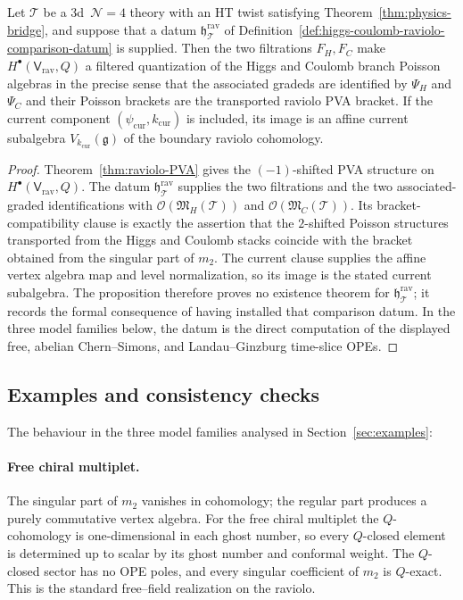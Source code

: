 \begin{proposition}
\label{prop:Higgs-Coulomb-compat}
Let $\mathcal T$ be a $3$d~$\mathcal N=4$ theory with an HT twist
satisfying Theorem~\ref{thm:physics-bridge}, and suppose that a datum
\(\mathfrak h_{\mathcal T}^{\mathrm{rav}}\) of
Definition~\ref{def:higgs-coulomb-raviolo-comparison-datum} is
supplied.  Then the two filtrations \(F_H,F_C\) make
\(H^\bullet(\mathsf V_{\mathrm{rav}},Q)\) a filtered quantization of
the Higgs and Coulomb branch Poisson algebras in the precise sense that
the associated gradeds are identified by \(\Psi_H\) and \(\Psi_C\) and
their Poisson brackets are the transported raviolo PVA bracket.  If
the current component \((\psi_{\mathrm{cur}},k_{\mathrm{cur}})\) is
included, its image is an affine current subalgebra
\(V_{k_{\mathrm{cur}}}(\mathfrak g)\) of the boundary raviolo
cohomology.
\end{proposition}
\begin{proof}
Theorem~\ref{thm:raviolo-PVA} gives the
\((-1)\)-shifted PVA structure on
\(H^\bullet(\mathsf V_{\mathrm{rav}},Q)\).  The datum
\(\mathfrak h_{\mathcal T}^{\mathrm{rav}}\) supplies the two filtrations
and the two associated-graded identifications with
\(\mathcal O(\mathfrak M_H(\mathcal T))\) and
\(\mathcal O(\mathfrak M_C(\mathcal T))\).  Its bracket-compatibility
clause is exactly the assertion that the \(2\)-shifted Poisson
structures transported from the Higgs and Coulomb stacks coincide with
the bracket obtained from the singular part of \(m_2\).  The current
clause supplies the affine vertex algebra map and level normalization,
so its image is the stated current subalgebra.  The proposition
therefore proves no existence theorem for
\(\mathfrak h_{\mathcal T}^{\mathrm{rav}}\); it records the formal
consequence of having installed that comparison datum.  In the three
model families below, the datum is the direct computation of the
displayed free, abelian Chern--Simons, and Landau--Ginzburg
time-slice OPEs.
\end{proof}
\subsection{Examples and consistency checks}
\label{subsec:raviolo-examples-2}
The behaviour in the three model families analysed in Section~\ref{sec:examples}:
\paragraph{\textbf{Free chiral multiplet.}}
The singular part of $m_2$ vanishes in cohomology; the regular part produces a purely commutative vertex algebra.
For the free chiral multiplet the $Q$-cohomology is one-dimensional in each ghost number, so every $Q$-closed element is determined up to scalar by its ghost number and conformal weight. The $Q$-closed sector has no OPE poles, and every singular coefficient of $m_2$ is $Q$-exact.
This is the standard free–field realization on the raviolo.
